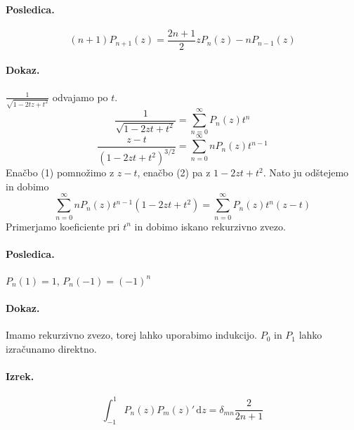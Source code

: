 \documentclass[a4paper]{article}
\newcommand{\dif}{\mathrm{d}}
\newcommand{\Sum}[2][0]{\sum_{{#2} = {#1}}^{\infty}}
\begin{document}
\paragraph{Posledica.} $$(n+1)P_{n+1}(z) = \frac{2n + 1}{2}zP_n(z) - nP_{n-1}(z)$$
\paragraph{Dokaz.} $\displaystyle{\frac{1}{\sqrt{1 - 2tz + t^2}}}$ odvajamo po $t$.
\begin{equation}
    \frac{1}{\sqrt{1-2zt + t^2}} = \Sum{n}P_n(z)t^n
\end{equation}
\begin{equation}
    \frac{z-t}{(1-2zt + t^2)^{3/2}} = \Sum{n} nP_n(z)t^{n-1}
\end{equation}
Enačbo (1) pomnožimo z $z-t$, enačbo (2) pa z $1 - 2zt + t^2$. Nato ju odštejemo in dobimo
$$\Sum{n} nP_n(z)t^{n-1}(1 - 2zt + t^2) = \Sum{n}P_n(z)t^n(z-t)$$
Primerjamo koeficiente pri $t^n$ in dobimo iskano rekurzivno zvezo.
\paragraph{Posledica.} $P_n(1) = 1$, $P_n(-1) = (-1)^n$
\paragraph{Dokaz.} Imamo rekurzivno zvezo, torej lahko uporabimo indukcijo. $P_0$ in $P_1$ lahko izračunamo direktno.
\paragraph{Izrek.} $$\int_{-1}^{1} P_n(z)P_m(z)' \, \dif z = \delta_{mn} \frac{2}{2n+1}$$
\end{document}
